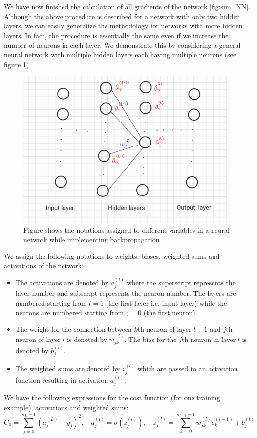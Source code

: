 We have now finished the calculation of all gradients of the network \ref{fig:sim_NN}. Although the above procedure is described for a network with only two hidden layers, 
we can easily generalize the methodology for networks with more hidden layers. In fact, the procedure is essentially the same even if we increase the number of neurons
in each layer. We demonstrate this by considering a general neural network with multiple hidden layers each having multiple neurons (see figure \ref{fig:back_p}). 
\begin{figure}[htbp]
    \centering
        \includegraphics[width=.5\textwidth, angle = -90]{Figures/back_prop.jpg}
        \caption{Figure shows the notations assigned to different variables in a neural network while implementing backpropagation}
        \label{fig:back_p}
    \end{figure} 
We assign the following notations to weights, biases, weighted sums and activations of the network:
\begin{itemize}
    \item The activations are denoted by $a_j^{(l)}$ where the superscript represents the layer number and subscript represents the neuron number. The 
    layers are numbered starting from $l=1$ (the first layer i.e. input layer) while the neurons are numbered starting from $j=0$ (the first neuron).
    \item The weight for the connection between $k$th neuron of layer $l-1$ and $j$th neuron of layer $l$ is denoted by $w_{jk}^{(l)}$. The bias for the $j$th neuron in
    layer $l$ is denoted by $b_j^{(l)}$.
    \item The weighted sums are denoted by $z_j^{(l)}$ which are passed to an activation function resulting in activation $a_j^{(l)}$.
\end{itemize}
We have the following expressions for the cost function (for one training example), activations and weighted sums:
$$C_0 = \sum_{j=0}^{n_L -1} (a_j^{(L)} - y_j)^2, \quad a_j^{(l)} = \sigma(z_j^{(l)}), \quad z_j^{(l)} = \sum_{k=0}^{n_{l-1} -1} w_{jk}^{(l)}a_k^{(l-1)} + b_j^{(l)}$$
